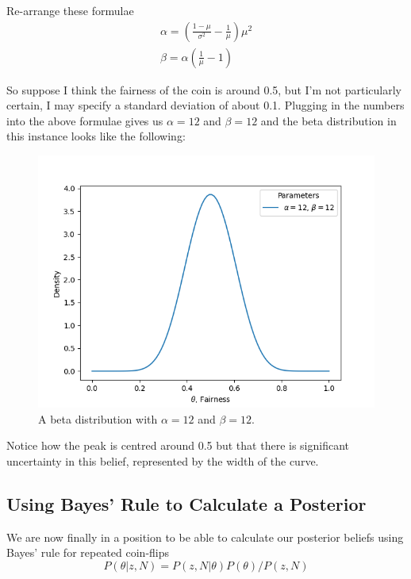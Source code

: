 Re-arrange these formulae 
\begin{equation}
  \begin{gathered}
    \alpha = \left(\frac{1-\mu}{\sigma^2} - \frac{1}{\mu} \right) \mu^2\\
    \beta = \alpha\left(\frac{1}{\mu}-1 \right)
  \end{gathered}
\end{equation}


So suppose I think the fairness of the coin is around 0.5, but I'm not particularly certain, I may specify a standard deviation of about 0.1. Plugging in the numbers into the above formulae gives us $\alpha = 12$ and $\beta = 12$ and the beta distribution in this instance looks like the following:
\begin{figure}[htb]
  \centering
  \includegraphics[width=.7\textwidth]{figures/beta_12_12}
  \caption{A beta distribution with $\alpha=12$ and $\beta=12$.}
  \label{fig:beta_12_12}
\end{figure}

Notice how the peak is centred around 0.5 but that there is significant uncertainty in this belief, represented by the width of the curve.

\subsection{Using Bayes' Rule to Calculate a Posterior}

We are now finally in a position to be able to calculate our posterior beliefs using Bayes' rule for repeated coin-flips
\begin{equation}
  P(\theta|z,N)=P(z,N|\theta)P(\theta)/P(z,N)
\end{equation}

